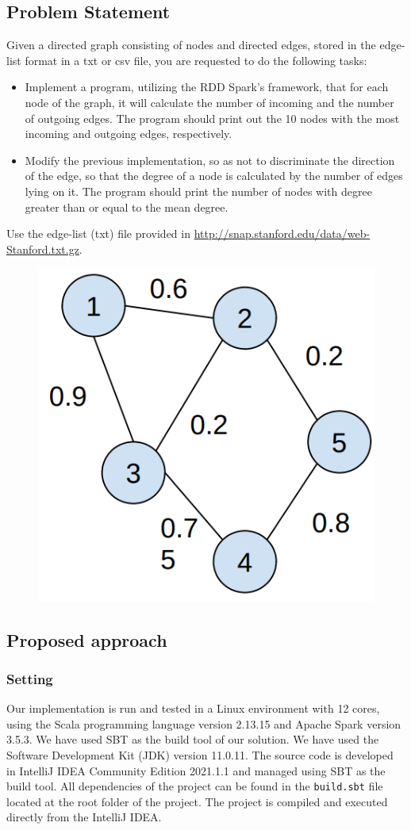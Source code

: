 \documentclass[acmlarge]{acmart}
\begin{document}
  \subsection{Problem Statement}
  Given a directed graph consisting of nodes and directed edges, stored in the edge-list format in a txt or csv file, you are requested to do the following tasks:
  \begin{itemize}
    \item Implement a program, utilizing the RDD Spark's framework, that for each node of the graph, it will calculate the number of incoming and the number of outgoing edges. The program should print out the 10 nodes with the most incoming and outgoing edges, respectively.
    \item Modify the previous implementation, so as not to discriminate the direction of the edge, so that the degree of a node is calculated by the number of edges lying on it. The program should print the number of nodes with degree greater than or equal to the mean degree.
  \end{itemize}
  Use the edge-list (txt) file provided in \url{http://snap.stanford.edu/data/web-Stanford.txt.gz}.
  \begin{figure}[h]
    \centering
    \includegraphics[width=0.25\linewidth]{figures/graph}
  \end{figure}

  \subsection{Proposed approach}
  \subsubsection{Setting}
  Our implementation is run and tested in a Linux environment with 12 cores, using the Scala programming language version 2.13.15 and Apache Spark version 3.5.3. We have used SBT as the build tool of our solution.
  We have used the Software Development Kit (JDK) version 11.0.11.
  The source code is developed in IntelliJ IDEA Community Edition 2021.1.1 and managed using SBT as the build tool. All dependencies of the project can be found in the \texttt{build.sbt} file located at the root folder of the project.
  The project is compiled and executed directly from the IntelliJ IDEA.
\end{document}
